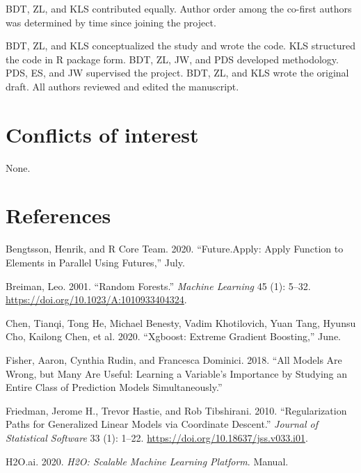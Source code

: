 \documentclass[
]{article}
\begin{document}
BDT, ZL, and KLS contributed equally. Author order among the co-first
authors was determined by time since joining the project.

BDT, ZL, and KLS conceptualized the study and wrote the code. KLS
structured the code in R package form. BDT, ZL, JW, and PDS developed
methodology. PDS, ES, and JW supervised the project. BDT, ZL, and KLS
wrote the original draft. All authors reviewed and edited the
manuscript.

\hypertarget{conflicts-of-interest}{%
\section{Conflicts of interest}\label{conflicts-of-interest}}

None.

\hypertarget{references}{%
\section*{References}\label{references}}

\hypertarget{refs}{}
\leavevmode\hypertarget{ref-bengtsson_futureapply_2020}{}%
Bengtsson, Henrik, and R Core Team. 2020. ``Future.Apply: Apply Function
to Elements in Parallel Using Futures,'' July.

\leavevmode\hypertarget{ref-breiman_random_2001}{}%
Breiman, Leo. 2001. ``Random Forests.'' \emph{Machine Learning} 45 (1):
5--32. \url{https://doi.org/10.1023/A:1010933404324}.

\leavevmode\hypertarget{ref-chen_xgboost_2020}{}%
Chen, Tianqi, Tong He, Michael Benesty, Vadim Khotilovich, Yuan Tang,
Hyunsu Cho, Kailong Chen, et al. 2020. ``Xgboost: Extreme Gradient
Boosting,'' June.

\leavevmode\hypertarget{ref-fisher_all_2018}{}%
Fisher, Aaron, Cynthia Rudin, and Francesca Dominici. 2018. ``All Models
Are Wrong, but Many Are Useful: Learning a Variable's Importance by
Studying an Entire Class of Prediction Models Simultaneously.''

\leavevmode\hypertarget{ref-friedman_regularization_2010}{}%
Friedman, Jerome H., Trevor Hastie, and Rob Tibshirani. 2010.
``Regularization Paths for Generalized Linear Models via Coordinate
Descent.'' \emph{Journal of Statistical Software} 33 (1): 1--22.
\url{https://doi.org/10.18637/jss.v033.i01}.

\leavevmode\hypertarget{ref-h2o_platform}{}%
H2O.ai. 2020. \emph{H2O: Scalable Machine Learning Platform}. Manual.
\end{document}
